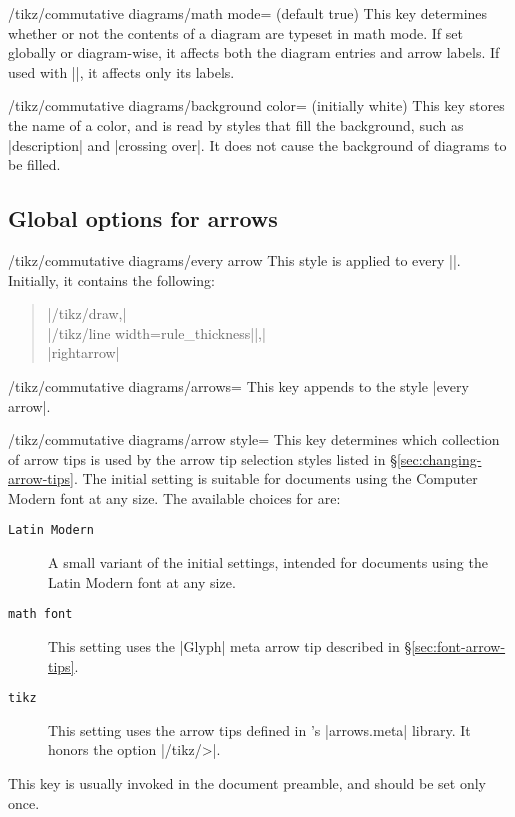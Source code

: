\documentclass[a4paper]{ltxdoc}
\begin{document}
\begin{key}{/tikz/commutative diagrams/math mode=
     (default true)}
   This key determines whether or not the contents of a diagram are
   typeset in math mode.  If set globally or diagram-wise, it affects
   both the diagram entries and arrow labels.  If used with |\arrow|,
   it affects only its labels.
\end{key}

\begin{key}{/tikz/commutative diagrams/background color= (initially white)}
  This key stores the name of a color, and is read by 
  styles that fill the background, such as |description| and |crossing over|.
  It does not cause the background of diagrams to be filled.
\end{key}

\subsection{Global options for arrows}
\label{sec:options-arrows}

\begin{stylekey}{/tikz/commutative diagrams/every arrow}
  This style is applied to every |\arrow|.  Initially, it contains the
  following:
\begin{verse}
|/tikz/draw,|\\
|/tikz/line width=rule_thickness||,|\\
|rightarrow|
\end{verse}
\end{stylekey}

\begin{key}{/tikz/commutative diagrams/arrows=}
  This key appends  to the style |every arrow|.
\end{key}

\begin{key}{/tikz/commutative diagrams/arrow style=}
  This key determines which collection of arrow tips is used by the
  arrow tip selection styles listed in
  \S\ref{sec:changing-arrow-tips}.  The initial setting is suitable
  for documents using the Computer Modern font at any size.  The
  available choices for  are:
  \begin{description}
  \item[\texttt{Latin Modern}] A small variant of the initial
    settings, intended for documents using the Latin Modern font at
    any size.
  \item[\texttt{math font}] This setting uses the |Glyph| meta arrow
    tip described in \S\ref{sec:font-arrow-tips}.
  \item[\texttt{tikz}] This setting uses the arrow tips defined in
    \tikzname's |arrows.meta| library.  It honors the option
    |/tikz/>|.
  \end{description}

  This key is usually invoked in the document preamble, and should be
  set only once.
\end{key}
\end{document}
